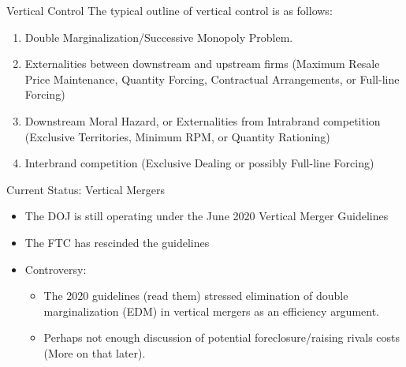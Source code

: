 

\begin{frame}{Vertical Control}
The typical outline of vertical control is as follows:\\
\begin{enumerate}
\item Double Marginalization/Successive Monopoly Problem.

\item Externalities between downstream and upstream firms (Maximum Resale Price Maintenance, Quantity Forcing, Contractual Arrangements, or Full-line Forcing)\\

\item Downstream Moral Hazard, or Externalities from Intrabrand competition (Exclusive Territories, Minimum RPM, or Quantity Rationing)\\

\item Interbrand competition (Exclusive Dealing or possibly Full-line Forcing)\\
\end{enumerate}
\end{frame}

\begin{frame}{Current Status: Vertical Mergers}
\begin{itemize}
\item The DOJ is still operating under the June 2020 Vertical Merger Guidelines
\item The FTC has rescinded the guidelines
\item Controversy:
\begin{itemize}
\item The 2020 guidelines (read them) stressed  \alert{elimination of double marginalization} (EDM) in vertical mergers as an \alert{efficiency} argument.
\item Perhaps not enough discussion of potential foreclosure/raising rivals costs (More on that later).
\end{itemize}
\end{itemize}
\end{frame}

